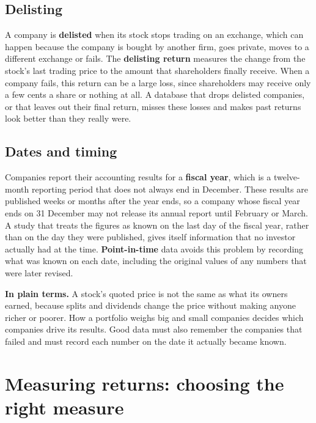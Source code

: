 \subsection{Delisting}

A company is \textbf{delisted} when its stock stops trading on an exchange, which can happen because the company is bought by another firm, goes private, moves to a different exchange or fails. The \textbf{delisting return} measures the change from the stock's last trading price to the amount that shareholders finally receive. When a company fails, this return can be a large loss, since shareholders may receive only a few cents a share or nothing at all. A database that drops delisted companies, or that leaves out their final return, misses these losses and makes past returns look better than they really were.


\subsection{Dates and timing}

Companies report their accounting results for a \textbf{fiscal year}, which is a twelve-month reporting period that does not always end in December. These results are published weeks or months after the year ends, so a company whose fiscal year ends on 31 December may not release its annual report until February or March. A study that treats the figures as known on the last day of the fiscal year, rather than on the day they were published, gives itself information that no investor actually had at the time. \textbf{Point-in-time} data avoids this problem by recording what was known on each date, including the original values of any numbers that were later revised.

\noindent\textbf{In plain terms.} A stock's quoted price is not the same as what its owners earned, because splits and dividends change the price without making anyone richer or poorer. How a portfolio weighs big and small companies decides which companies drive its results. Good data must also remember the companies that failed and must record each number on the date it actually became known.

\section{Measuring returns: choosing the right measure}
\label{sec:02-returns}

